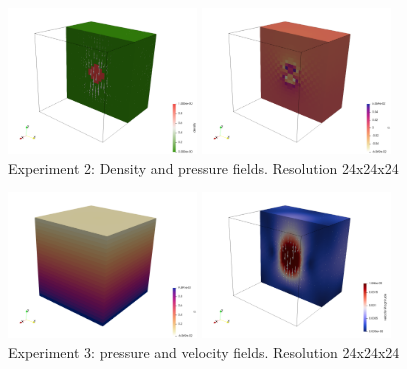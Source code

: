 \begin{center}
\includegraphics[width=5cm]{python_codes/fieldstone_10/results/dens_2}
\includegraphics[width=5cm]{python_codes/fieldstone_10/results/press_2}\\
{\small Experiment 2: Density and pressure fields. Resolution 24x24x24}
\end{center}


\begin{center}
\includegraphics[width=5cm]{python_codes/fieldstone_10/results/press_3}
\includegraphics[width=5cm]{python_codes/fieldstone_10/results/vel_3}\\
{\small Experiment 3: pressure and velocity fields. Resolution 24x24x24}
\end{center}




